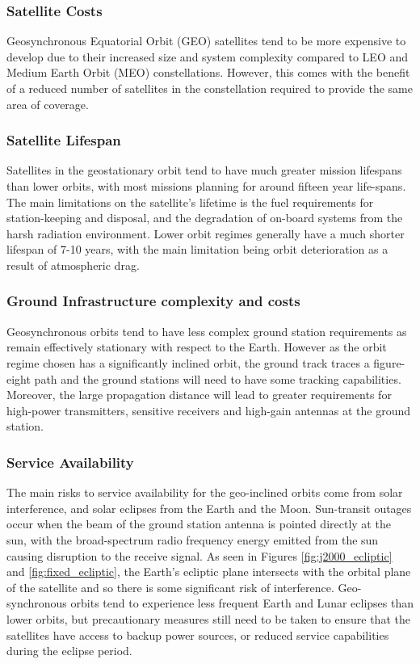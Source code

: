 \documentclass[12pt]{article}
\begin{document}
\subsubsection{Satellite Costs}
    Geosynchronous Equatorial Orbit (GEO) satellites tend to be more expensive to develop due to their increased size and system complexity compared to LEO and Medium Earth Orbit (MEO) constellations. However, this comes with the benefit of a reduced number of satellites in the constellation required to provide the same area of coverage.  

\subsubsection{Satellite Lifespan}
    Satellites in the geostationary orbit tend to have much greater mission lifespans than lower orbits, with most missions planning for around fifteen year life-spans. The main limitations on the satellite's lifetime is the fuel requirements for station-keeping and disposal, and the degradation of on-board systems from the harsh radiation environment. Lower orbit regimes generally have a much shorter lifespan of 7-10 years, with the main limitation being orbit deterioration as a result of atmospheric drag. 

\subsubsection{Ground Infrastructure complexity and costs}
    Geosynchronous orbits tend to have less complex ground station requirements as remain effectively stationary with respect to the Earth. However as the orbit regime chosen has a significantly inclined orbit, the ground track traces a figure-eight path and the ground stations will need to have some tracking capabilities. Moreover, the large propagation distance will lead to greater requirements for high-power transmitters, sensitive receivers and high-gain antennas at the ground station. 

\subsubsection{Service Availability}
    The main risks to service availability for the geo-inclined orbits come from solar interference, and solar eclipses from the Earth and the Moon. Sun-transit outages occur when the beam of the ground station antenna is pointed directly at the sun, with the broad-spectrum radio frequency energy emitted from the sun causing disruption to the receive signal. As seen in Figures \ref{fig:j2000_ecliptic} and \ref{fig:fixed_ecliptic}, the Earth's ecliptic plane intersects with the orbital plane of the satellite and so there is some significant risk of interference. Geo-synchronous orbits tend to experience less frequent Earth and Lunar eclipses than lower orbits, but precautionary measures still need to be taken to ensure that the satellites have access to backup power sources, or reduced service capabilities during the eclipse period.
\end{document}
